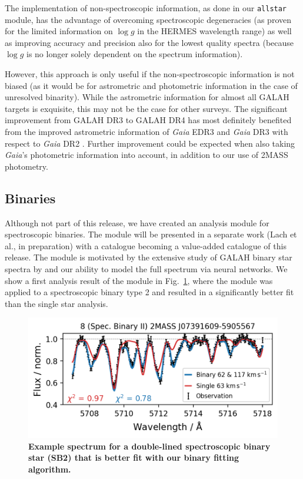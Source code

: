 \documentclass[
  journal=pasa,
  manuscript=research-paper, %
  year=2024,
  volume=37
]{cup-journal}
\newcommand{\logg}{$\log g$\xspace}
\begin{document}
The implementation of non-spectroscopic information, as done in our \texttt{allstar} module, has the advantage of overcoming spectroscopic degeneracies (as proven for the limited information on \logg in the HERMES wavelength range) as well as improving accuracy and precision also for the lowest quality spectra (because \logg is no longer solely dependent on the spectrum information).

However, this approach is only useful if the non-spectroscopic information is not biased (as it would be for astrometric and photometric information in the case of unresolved binarity). While the astrometric information for almost all GALAH targets is exquisite, this may not be the case for other surveys. The significant improvement from GALAH DR3 to GALAH DR4 has most definitely benefited from the improved astrometric information of \textit{Gaia} EDR3 \citep{GaiaEDR3, Lindegren2021a} and \textit{Gaia} DR3 \citep{GaiaDR3} with respect to \textit{Gaia} DR2 \citep{Brown2018, Lindegren2018}. Further improvement could be expected when also taking \textit{Gaia}'s photometric information into account, in addition to our use of 2MASS photometry.

\subsection{Binaries} \label{sec:caveats_binaries}

Although not part of this release, we have created an analysis module for spectroscopic binaries. The module will be presented in a separate work (Lach et al., in preparation) with a catalogue becoming a value-added catalogue of this release. The module is motivated by the extensive study of GALAH binary star spectra by \citet{Traven2020} and our ability to model the full spectrum via neural networks. We show a first analysis result of the module in Fig.~\ref{fig:examples_flag_sp_3}, where the module was applied to a spectroscopic binary type 2 and resulted in a significantly better fit than the single star analysis.

\begin{figure}[ht]
 \centering
 \includegraphics[width=\textwidth]{figures/examples_flag_sp_3.png}
 \caption{\textbf{Example spectrum for a double-lined spectroscopic binary star (SB2) that is better fit with our binary fitting algorithm.}} \label{fig:examples_flag_sp_3}
\end{figure}
\end{document}
